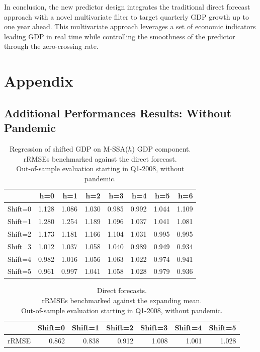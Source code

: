 \documentclass[11pt,a4paper]{article}
\begin{document}
In conclusion, the new predictor design integrates the traditional direct forecast approach with a novel multivariate filter to target quarterly GDP growth up to one year ahead. This multivariate approach leverages a set of economic indicators leading GDP in real time while controlling the smoothness of the predictor through the zero-crossing rate. 




\newpage
\section{Appendix}\label{sec:Appendix}

\subsection{Additional Performances Results: Without Pandemic}


\begin{table}[ht]
\centering
\begin{tabular}{rrrrrrrr}
  \hline
 & h=0 & h=1 & h=2 & h=3 & h=4 & h=5 & h=6 \\ 
  \hline
Shift=0 & 1.128 & 1.086 & 1.030 & 0.985 & 0.992 & 1.044 & 1.109 \\ 
  Shift=1 & 1.280 & 1.254 & 1.189 & 1.096 & 1.037 & 1.041 & 1.081 \\ 
  Shift=2 & 1.173 & 1.181 & 1.166 & 1.104 & 1.031 & 0.995 & 0.995 \\ 
  Shift=3 & 1.012 & 1.037 & 1.058 & 1.040 & 0.989 & 0.949 & 0.934 \\ 
  Shift=4 & 0.982 & 1.016 & 1.056 & 1.063 & 1.022 & 0.974 & 0.941 \\ 
  Shift=5 & 0.961 & 0.997 & 1.041 & 1.058 & 1.028 & 0.979 & 0.936 \\ 
   \hline
\end{tabular}
\caption{Regression of shifted GDP on M-SSA($h$) GDP component.\\rRMSEs benchmarked against the direct forecast.\\Out-of-sample evaluation starting in Q1-2008, without pandemic.} 
\label{rRMSE_mSSA_comp_direct_without_covid7}
\end{table}%
\begin{table}[ht]
\centering
\begin{tabular}{rrrrrrr}
  \hline
 & Shift=0 & Shift=1 & Shift=2 & Shift=3 & Shift=4 & Shift=5 \\ 
  \hline
rRMSE & 0.862 & 0.838 & 0.912 & 1.008 & 1.001 & 1.028 \\  
   \hline
\end{tabular}
\caption{Direct forecasts.\\
rRMSEs benchmarked against the expanding mean.\\Out-of-sample evaluation starting in Q1-2008, without pandemic.} 
\label{rRMSE_mSSA_direct_mean_without_covid8}
\end{table}
\end{document}
